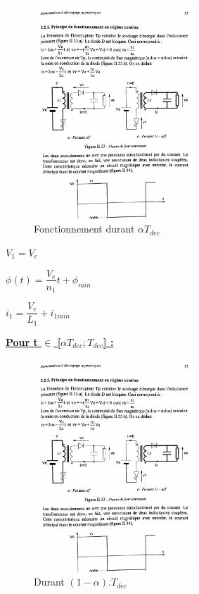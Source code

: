 \documentclass[12pt]{article}
\begin{document}
\begin{figure}
  \vspace{-80pt}
  \hspace{-0pt}
  \begin{center}
    \includegraphics[width=6cm,trim=0cm 48cm 43.5cm 40cm, clip=true]{Images_Rapport/courants.pdf}
  \end{center}
  \vspace{-5pt}
  \caption{Fonctionnement durant $\alpha T_{dec}$}
  \vspace{-10pt}
\end{figure}
\vspace{30pt}
$V_1 = V_e $\par
\vspace{10pt}
$\phi (t) = \dfrac{V_e}{n_1}t + \phi_{min}$\par
\vspace{10pt}
$i_1 = \dfrac{V_e}{L_1} + i_{1min}$ 


\vspace{30pt}

\textbf{\underline{Pour t $\in$ [$\alpha T_{dec};T_{dec}$] : }}


\begin{figure}
  \vspace{-80pt}
  \hspace{-0pt}
  \begin{center}
    \includegraphics[width=6cm,trim=45.5cm 48cm 0cm 40cm, clip=true]{Images_Rapport/courants.pdf}
  \end{center}
  \vspace{-5pt}
  \caption{Durant $(1-\alpha). T_{dec}$}
  \vspace{-10pt}
\end{figure}
\end{document}
